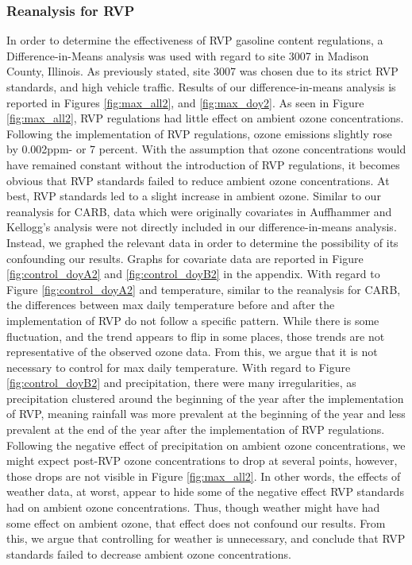 \documentclass{article}
\begin{document}
\subsubsection{Reanalysis for RVP}
In order to determine the effectiveness of RVP gasoline content regulations, a Difference-in-Means analysis was used with regard to site 3007 in Madison County, Illinois. As previously stated, site 3007 was chosen due to its strict RVP standards, and high vehicle traffic. Results of our difference-in-means analysis is reported in Figures \ref{fig:max_all2}, and \ref{fig:max_doy2}. As seen in Figure \ref{fig:max_all2}, RVP regulations had little effect on ambient ozone concentrations. Following the implementation of RVP regulations, ozone emissions slightly rose by 0.002ppm- or 7 percent. With the assumption that ozone concentrations would have remained constant without the introduction of RVP regulations, it becomes obvious that RVP standards failed to reduce ambient ozone concentrations. At best, RVP standards led to a slight increase in ambient ozone. Similar to our reanalysis for CARB, data which were originally covariates in Auffhammer and Kellogg's analysis were not directly included in our difference-in-means analysis. Instead, we graphed the relevant data in order to determine the possibility of its confounding our results. Graphs for covariate data are reported in Figure \ref{fig:control_doyA2} and \ref{fig:control_doyB2} in the appendix. With regard to Figure \ref{fig:control_doyA2} and temperature, similar to the reanalysis for CARB, the differences between max daily temperature before and after the implementation of RVP do not follow a specific pattern. While there is some fluctuation, and the trend appears to flip in some places, those trends are not representative of the observed ozone data. From this, we argue that it is not necessary to control for max daily temperature. With regard to Figure \ref{fig:control_doyB2} and precipitation, there were many irregularities, as precipitation clustered around the beginning of the year after the implementation of RVP, meaning rainfall was more prevalent at the beginning of the year and less prevalent at the end of the year after the implementation of RVP regulations. Following the negative effect of precipitation on ambient ozone concentrations, we might expect post-RVP ozone concentrations to drop at several points, however, those drops are not visible in Figure \ref{fig:max_all2}. In other words, the effects of weather data, at worst, appear to hide some of the negative effect RVP standards had on ambient ozone concentrations. Thus, though weather might have had some effect on ambient ozone, that effect does not confound our results. From this, we argue that controlling for weather is unnecessary, and conclude that RVP standards failed to decrease ambient ozone concentrations.
\end{document}
